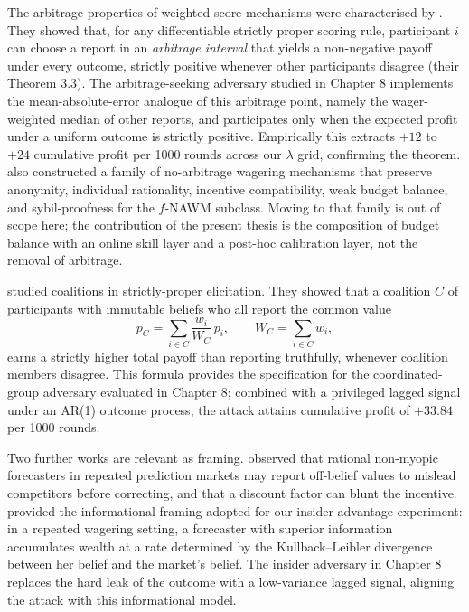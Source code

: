 \documentclass[
  11pt,
  a4paper,
  oneside]{report}
\begin{document}
The arbitrage properties of weighted-score mechanisms were characterised
by \citet{chen2014arbitrage}. They showed that, for any differentiable
strictly proper scoring rule, participant \(i\) can choose a report in
an \emph{arbitrage interval} that yields a non-negative payoff under
every outcome, strictly positive whenever other participants disagree
(their Theorem 3.3). The arbitrage-seeking adversary studied in Chapter
8 implements the mean-absolute-error analogue of this arbitrage point,
namely the wager-weighted median of other reports, and participates only
when the expected profit under a uniform outcome is strictly positive.
Empirically this extracts \(+12\) to \(+24\) cumulative profit per 1000
rounds across our \(\lambda\) grid, confirming the theorem.
\citet{chen2014arbitrage} also constructed a family of no-arbitrage
wagering mechanisms that preserve anonymity, individual rationality,
incentive compatibility, weak budget balance, and sybil-proofness for
the \(f\)-NAWM subclass. Moving to that family is out of scope here; the
contribution of the present thesis is the composition of budget balance
with an online skill layer and a post-hoc calibration layer, not the
removal of arbitrage.

\citet{chun2011cooperating} studied coalitions in strictly-proper
elicitation. They showed that a coalition \(C\) of participants with
immutable beliefs who all report the common value
\[p_C = \sum_{i \in C} \frac{w_i}{W_C}\, p_i, \qquad
  W_C = \sum_{i \in C} w_i,\] earns a strictly higher total payoff than
reporting truthfully, whenever coalition members disagree. This formula
provides the specification for the coordinated-group adversary evaluated
in Chapter 8; combined with a privileged lagged signal under an AR(1)
outcome process, the attack attains cumulative profit of \(+33.84\) per
1000 rounds.

Two further works are relevant as framing. \citet{dimitrov2008nonmyopic}
observed that rational non-myopic forecasters in repeated prediction
markets may report off-belief values to mislead competitors before
correcting, and that a discount factor can blunt the incentive.
\citet{johnstone2007economic} provided the informational framing adopted
for our insider-advantage experiment: in a repeated wagering setting, a
forecaster with superior information accumulates wealth at a rate
determined by the Kullback--Leibler divergence between her belief and
the market's belief. The insider adversary in Chapter 8 replaces the
hard leak of the outcome with a low-variance lagged signal, aligning the
attack with this informational model.
\end{document}
